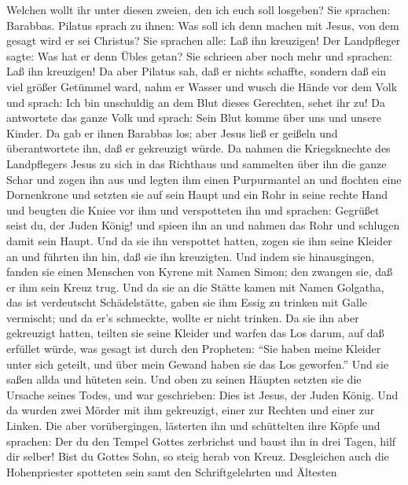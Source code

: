 Welchen wollt ihr unter diesen zweien, den ich euch soll losgeben? Sie
sprachen: Barabbas.  Pilatus sprach zu ihnen: Was soll ich
denn machen mit Jesus, von dem gesagt wird er sei Christus? Sie sprachen
alle: Laß ihn kreuzigen!  Der Landpfleger sagte: Was hat er
denn Übles getan? Sie schrieen aber noch mehr und sprachen: Laß ihn
kreuzigen!  Da aber Pilatus sah, daß er nichts schaffte,
sondern daß ein viel größer Getümmel ward, nahm er Wasser und wusch die
Hände vor dem Volk und sprach: Ich bin unschuldig an dem Blut dieses
Gerechten, sehet ihr zu!  Da antwortete das ganze Volk und
sprach: Sein Blut komme über uns und unsere Kinder.  Da gab
er ihnen Barabbas los; aber Jesus ließ er geißeln und überantwortete
ihn, daß er gekreuzigt würde.  Da nahmen die Kriegsknechte
des Landpflegers Jesus zu sich in das Richthaus und sammelten über ihn
die ganze Schar  und zogen ihn aus und legten ihm einen
Purpurmantel an  und flochten eine Dornenkrone und setzten
sie auf sein Haupt und ein Rohr in seine rechte Hand und beugten die
Kniee vor ihm und verspotteten ihn und sprachen: Gegrüßet seist du, der
Juden König!  und spieen ihn an und nahmen das Rohr und
schlugen damit sein Haupt.  Und da sie ihn verspottet
hatten, zogen sie ihm seine Kleider an und führten ihn hin, daß sie ihn
kreuzigten.  Und indem sie hinausgingen, fanden sie einen
Menschen von Kyrene mit Namen Simon; den zwangen sie, daß er ihm sein
Kreuz trug.  Und da sie an die Stätte kamen mit Namen
Golgatha, das ist verdeutscht Schädelstätte,  gaben sie ihm
Essig zu trinken mit Galle vermischt; und da er's schmeckte, wollte er
nicht trinken.  Da sie ihn aber gekreuzigt hatten, teilten
sie seine Kleider und warfen das Los darum, auf daß erfüllet würde, was
gesagt ist durch den Propheten: ``Sie haben meine Kleider unter sich
geteilt, und über mein Gewand haben sie das Los geworfen.''
 Und sie saßen allda und hüteten sein.  Und
oben zu seinen Häupten setzten sie die Ursache seines Todes, und war
geschrieben: Dies ist Jesus, der Juden König.  Und da
wurden zwei Mörder mit ihm gekreuzigt, einer zur Rechten und einer zur
Linken.  Die aber vorübergingen, lästerten ihn und
schüttelten ihre Köpfe  und sprachen: Der du den Tempel
Gottes zerbrichst und baust ihn in drei Tagen, hilf dir selber! Bist du
Gottes Sohn, so steig herab von Kreuz.  Desgleichen auch
die Hohenpriester spotteten sein samt den Schriftgelehrten und Ältesten

